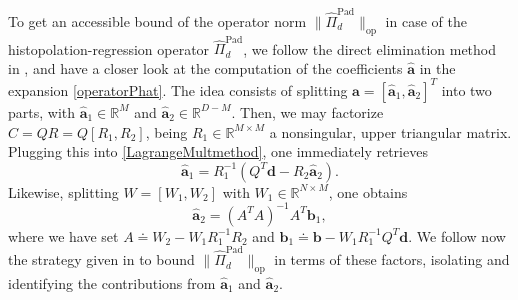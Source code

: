 \documentclass{svjour3}
\newcommand{\R}{\mathbb{R}} %
\begin{document}
To get an accessible bound of the operator norm $ \| \hat{\Pi}_d^{\mathrm{Pad}} \|_{\mathrm{op}} $ in case of the histopolation-regression operator $\hat{\Pi}_d^{\mathrm{Pad}}$, we follow the direct elimination method in \cite[Chapter 5]{bjorck2024numerical}, and have a closer look at the computation of the coefficients $\hat{\boldsymbol{a}}$ in the expansion \eqref{operatorPhat}. The idea consists of splitting $\hat{\boldsymbol{a}} =\left[\hat{\boldsymbol{a}}_1, \hat{\boldsymbol{a}}_2\right]^T $ into two parts, with $ \hat{\boldsymbol{a}}_1 \in \R^M $ and $ \hat{\boldsymbol{a}}_2 \in \R^{D-M} $. Then, we may factorize $ C = QR = Q \left[R_1 , R_2 \right]$, being $ R_1 \in \R^{M \times M} $ a nonsingular, upper triangular matrix. %
Plugging this into \eqref{LagrangeMultmethod}, one immediately retrieves
\begin{equation}\label{a1eq}
\hat{\boldsymbol{a}}_1 = R_{1}^{-1} \left(Q^T\boldsymbol{d} - R_{2} \hat{\boldsymbol{a}}_2\right).    
\end{equation}
Likewise, splitting $ W = \left[W_1 , W_2\right] $ with $ W_1 \in \R^{N \times M} $, one obtains
\begin{equation}\label{a2eq}
	\hat{\boldsymbol{a}}_2=\left(A^{T} A\right)^{-1}A^{T}\boldsymbol{b}_1,
\end{equation}
where we have set $ A \doteq W_2 - W_1 R_{1}^{-1} R_{2} $ and $ \boldsymbol{b}_1 \doteq \boldsymbol{b} - W_1 R_{1}^{-1} Q^T\boldsymbol{d} $. We follow now the strategy given in \cite{Submitted:2025:OTE} to bound $ \| \hat{\Pi}_d^{\mathrm{Pad}} \|_{\mathrm{op}} $ in terms of these factors, isolating and identifying the contributions from $ \hat{\boldsymbol{a}}_1 $ and $ \hat{\boldsymbol{a}}_2 $.
\end{document}
